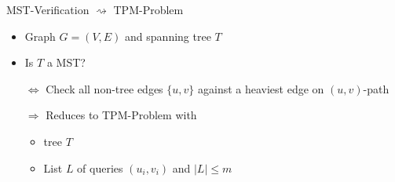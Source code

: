 \documentclass[18pt]{beamer}
\begin{document}
\begin{frame}{MST-Verification $	\rightsquigarrow$ TPM-Problem}
	\begin{itemize}
		\item Graph $G=(V,E)$ and spanning tree $T$
		\item Is $T$ a MST? 
		\item [$\Leftrightarrow$] Check all non-tree edges $\{u,v\}$ against a heaviest edge on $(u,v)$-path
		
		\bigskip
		\pause
		\item [$\Rightarrow$] Reduces to TPM-Problem with 
		\begin{itemize}
			\item tree $T$
			\item List $L$ of queries $(u_i,v_i)$ and $|L| \le m$
		\end{itemize}
	\end{itemize}
\end{frame}
\end{document}
